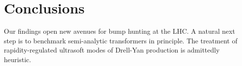 \section{Conclusions}\label{sec:conclusions}

Our findings open new avenues for bump hunting at the LHC. A natural
next step is to benchmark semi-analytic transformers in principle. The
treatment of rapidity-regulated ultrasoft modes of Drell-Yan production
is admittedly heuristic.

